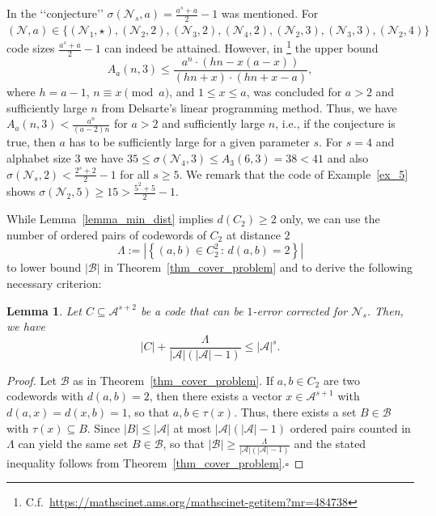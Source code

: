\documentclass[11pt]{article}
\newcommand{\cA}{\mathcal{A}}
\newcommand{\cN}{\mathcal{N}}
\newtheorem{lemma}[theorem]{Lemma}
\begin{document}
In \cite[Remark 5.10]{beemer2022network_arxiv} the {\lq\lq}conjecture{\rq\rq} $\sigma(\cN_s,a)=\frac{a^s+a}{2}-1$ was mentioned. For $(\cN,a)\in 
\big\{(\cN_1,\star),(\cN_2,2),(\cN_3,2),(\cN_4,2),(\cN_2,3),(\cN_3,3),(\cN_2,4)\big\}$ code sizes $\frac{a^s+a}{2}-1$ can indeed be attained.  
However, in \cite{roos1978some}\footnote{C.f.\ \url{https://mathscinet.ams.org/mathscinet-getitem?mr=484738}} the upper bound
$$
  A_a(n,3) \le \frac{a^n \cdot  (hn-x(a-x))}{(hn+x)\cdot (hn+x-a)},
$$   
where $h=a-1$,  $n \equiv x \pmod a$, and $1\le x\le a$, was concluded for $a>2$ and sufficiently large $n$ from 
Delsarte's linear programming method. 
Thus, we have $A_a(n,3) < \frac{a^n}{(a-2)n}$ for $a>2$ and sufficiently large $n$, i.e., if the conjecture is true, then $a$ 
has to be sufficiently large for a given parameter $s$. For $s=4$ and alphabet size $3$ we have $35 \le \sigma(\cN_4,3)\le A_3(6,3)=38<41$ 
and also $\sigma(\cN_s,2)<\frac{2^s+2}{2}-1$ for all $s\ge 5$.  
We remark that the code of Example~\ref{ex_5} shows $\sigma(\cN_2,5)\ge 15>\frac{5^2+5}{2}-1$.

\medskip

While Lemma~\ref{lemma_min_dist} implies $d(C_2)\ge 2$ only, we can use the number of ordered pairs of codewords 
of $C_2$ at distance $2$ 
\begin{equation}
  \Lambda:=\left|\left\{(a,b)\in C_2^2\,:\, d(a,b)=2\right\}\right| 
\end{equation}
to lower bound $|\mathcal{B}|$ in Theorem~\ref{thm_cover_problem} and to derive the following necessary criterion:
\begin{lemma}
  \label{lemma_bound_pairs_at_distance_2}
  Let $C\subseteq \cA^{s+2}$ be a code that can be $1$-error corrected for $\cN_s$. 
  Then, we have 
  $$
    |C|+ \frac{\Lambda}{|\cA|(|\cA|-1)} \le |\cA|^s.
  $$ 
\end{lemma} 
\begin{proof}
  Let $\mathcal{B}$ as in Theorem~\ref{thm_cover_problem}. If $a,b\in C_2$ are two codewords with $d(a,b)=2$, then there exists a vector 
  $x\in \cA^{s+1}$ with $d(a,x)=d(x,b)=1$, so that $a,b\in \tau(x)$. Thus, there exists a set $B\in\mathcal{B}$ 
  with $\tau(x)\subseteq B$. Since $|B|\le |\cA$| at most $|\cA|(|\cA|-1)$ ordered pairs counted in $\Lambda$ can yield the same 
  set $B\in \mathcal{B}$, so that $|\mathcal{B}|\ge \frac{\Lambda}{|\cA|(|\cA|-1)}$ and the stated inequality follows from 
  Theorem~\ref{thm_cover_problem}.\hfill{$\square$} 
\end{proof}
\end{document}

